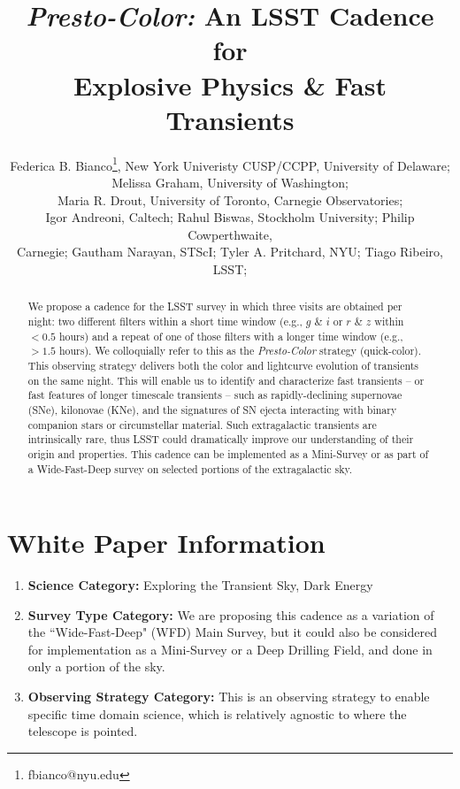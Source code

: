 \documentclass[12pt, letterpaper]{article}
\title{{\em Presto-Color:} An LSST Cadence for \\ Explosive Physics \& Fast Transients}
\author{\small{Federica B. Bianco\footnote{fbianco@nyu.edu}, New York Univeristy CUSP/CCPP, University of Delaware;}\\\small{Melissa Graham, University of Washington;}\\\small{Maria R. Drout, University of Toronto, Carnegie Observatories;}\\\small{Igor Andreoni, Caltech; Rahul Biswas, Stockholm University; Philip Cowperthwaite,}\\\small{Carnegie; Gautham Narayan, STScI; Tyler A. Pritchard, NYU; Tiago Ribeiro, LSST;}}
\begin{document}
\maketitle
\vspace{-0.3in}
\begin{abstract}
We propose a cadence for the LSST survey in which three visits are obtained per night: two different filters within a short time window (e.g., $g$ \& $i$ or $r$ \& $z$ within $<0.5$ hours) and a repeat of one of those filters with a longer time window (e.g., $>1.5$ hours). We colloquially refer to this as the {\em Presto-Color} strategy (quick-color). This observing strategy delivers both the color and lightcurve evolution of transients on the same night. This will enable us to identify and characterize fast transients -- or fast features of longer timescale transients -- such as rapidly-declining supernovae (SNe), kilonovae (KNe), and the signatures of SN ejecta interacting with binary companion stars or circumstellar material. Such extragalactic transients are intrinsically rare, thus LSST could dramatically improve our understanding of their origin and properties. This cadence can be implemented as a Mini-Survey or as part of a Wide-Fast-Deep survey on selected portions of the extragalactic sky.
\end{abstract}

\section{White Paper Information}
\begin{enumerate} 
\vspace{-0.05in}
\item {\bf Science Category:} Exploring the Transient Sky, Dark Energy \label{sec:item:category}
\vspace{-0.05in}
\item {\bf Survey Type Category:} We are proposing this cadence as a variation of the  ``Wide-Fast-Deep" (WFD) Main Survey, but it could also be considered for implementation as a Mini-Survey or a Deep Drilling Field, and done in only a portion of the sky. 
\vspace{-0.05in}
\item {\bf Observing Strategy Category:} This is an observing strategy to enable specific time domain science, which is relatively agnostic to where the telescope is pointed. 
\end{enumerate}  


\clearpage
\end{document}

